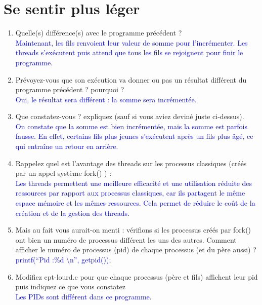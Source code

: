 \documentclass{article}
\begin{document}
	\section{Se sentir plus léger}
	\begin{enumerate}
		\item Quelle(s) différence(s) avec le programme précédent ? \\
			\textcolor{blue}{Maintenant, les fils renvoient leur valeur de somme pour l'incrémenter. Les threads s'exécutent puis attend que tous les fils se rejoignent pour finir le programme.} \\
		\item Prévoyez-vous que son exécution va donner ou pas un résultat différent du programme précédent ? pourquoi ? \\
			\textcolor{blue}{Oui, le résultat sera différent : la somme sera incrémentée.} \\
		\item Que constatez-vous ? expliquez (sauf si vous aviez deviné juste ci-dessus). \\
			\textcolor{blue}{On constate que la somme est bien incrémentée, mais la somme est parfois fausse. En effet, certains fils plus jeunes s'exécutent après un fils plus âgé, ce qui entraîne un retour en arrière.} \\
		\item Rappelez quel est l’avantage des threads sur les processus classiques (créés par un
		appel système fork() ) : \\
			\textcolor{blue}{Les threads permettent une meilleure efficacité et une utilisation réduite des ressources par rapport aux processus classiques, car ils partagent le même espace mémoire et les mêmes ressources. Cela permet de réduire le coût de la création et de la gestion des threads.} \\
		\item Mais au fait vous aurait-on menti : vérifions si les processus créés par fork() ont
		bien un numéro de processus différent les uns des autres. Comment afficher le numéro
		de processus (pid) de chaque processus (et du père aussi) ? \\
			\textcolor{blue}{printf(``Pid :\%d \textbackslash{}n'', getpid());}\\
		\item Modifiez cpt-lourd.c pour que chaque processus (père et fils) affichent leur pid puis
		indiquez ce que vous constatez \\
			\textcolor{blue}{Les PIDs sont différent dans ce programme.}\\

\end{enumerate}
\end{document}
